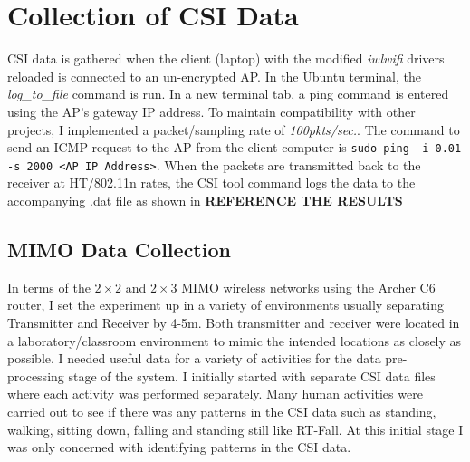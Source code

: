 \section{Collection of CSI Data}
CSI data is gathered when the client (laptop) with the modified \textit{iwlwifi} drivers reloaded is connected to an un-encrypted AP. In the Ubuntu terminal, the \textit{log\_to\_file} command is run. In a new terminal tab, a ping command is entered using the AP's gateway IP address. To maintain compatibility with other projects, I implemented a packet/sampling rate of \textit{100pkts/sec.}. The command to send an ICMP request to the AP from the client computer is \lstinline{sudo ping -i 0.01 -s 2000 <AP IP Address>}. When the packets are transmitted back to the receiver at HT/802.11n rates, the CSI tool command logs the data to the accompanying .dat file as shown in \textbf{REFERENCE THE RESULTS}
\subsection{MIMO Data Collection}
In terms of the $2\times 2$ and $2\times 3$ MIMO wireless networks using the Archer C6 router, I set the experiment up in a variety of environments usually separating Transmitter and Receiver by 4-5m. Both transmitter and receiver were located in a laboratory/classroom environment to mimic the intended locations as closely as possible. I needed useful data for a variety of activities for the data pre-processing stage of the system. I initially started with separate CSI data files where each activity was performed separately. Many human activities were carried out to see if there was any patterns in the CSI data such as standing, walking, sitting down, falling and standing still like RT-Fall. At this initial stage I was only concerned with identifying patterns in the CSI data. 
\begin{comment}In the future, I will need to devise an experiment which gathers 10+ minutes of real-life data from an environment such as a living room to identify consecutive human activities. This would provide a more accurate representation of how the channel changes due to consecutive human movements and lead to a more robust data processing and activity segmentation process.\end{comment}
